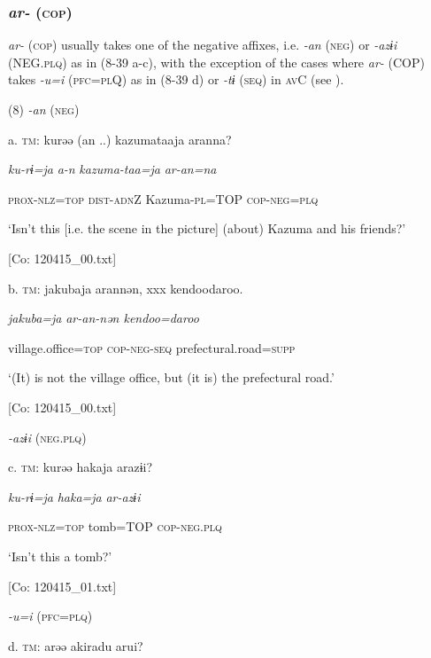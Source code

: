 \subsubsection{\textit{ar-} (\textsc{cop})}

\textit{ar-} (\textsc{cop}) usually takes one of the negative affixes, i.e. \textit{{}-an} (\textsc{neg}) or \textit{{}-azɨi} (NEG.\textsc{plq}) as in (8-39 a-c), with the exception of the cases where \textit{ar-} (COP) takes \textit{{}-u=i} (\textsc{pfc}=\textsc{pl}Q) as in (8-39 d) or \textit{{}-tɨ} (\textsc{seq}) in \textsc{av}C (see ).

(8)  \textit{{}-an} (\textsc{neg})

  a.  \textsc{tm}:  kurəə  (an ..)  kazumataaja  aranna?

      \textit{ku-rɨ=ja}  \textit{a-n}  \textit{kazuma-taa=ja}  \textit{ar-an=na}

      \textsc{prox}-\textsc{nlz}=\textsc{top}  \textsc{dist}-\textsc{adn}Z  Kazuma-\textsc{pl}=TOP  \textsc{cop}-\textsc{neg}=\textsc{plq}

      ‘Isn’t this [i.e. the scene in the picture] (about) Kazuma and his friends?’

      [Co: 120415\_00.txt]

  b.  \textsc{tm}:  jakubaja  arannən,  xxx  {\textbar}kendoo{\textbar}daroo.

      \textit{jakuba=ja}  \textit{ar-an{}-nən    kendoo=daroo}

      village.office=\textsc{top}  \textsc{cop}-\textsc{neg}-\textsc{seq}    prefectural.road=\textsc{supp}

      ‘(It) is not the village office, but (it is) the prefectural road.’

      [Co: 120415\_00.txt]

  \textit{{}-azɨi} (\textsc{neg}.\textsc{plq})

  c.  \textsc{tm}:  kurəə  hakaja  arazɨi?

      \textit{ku-rɨ=ja}  \textit{haka=ja}  \textit{ar-azɨi}

      \textsc{prox}-\textsc{nlz}=\textsc{top}  tomb=TOP  \textsc{cop}-\textsc{neg}.\textsc{plq}

      ‘Isn’t this a tomb?’

      [Co: 120415\_01.txt]

  \textit{{}-u=i} (\textsc{pfc}=\textsc{plq})

  d.  \textsc{tm}:  arəə  akiradu  arui?


